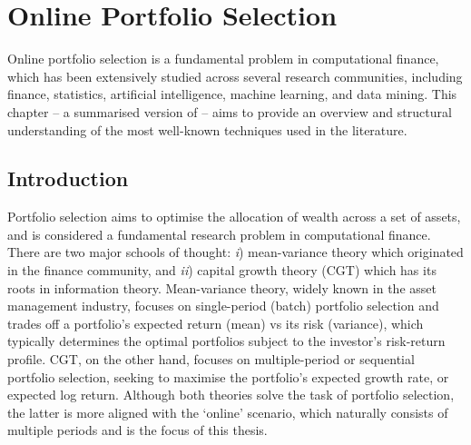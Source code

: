 \chapter{Online Portfolio Selection}
\label{ch:olps}

\minitoc




Online portfolio selection is a fundamental problem in computational finance, which has been extensively studied across several research communities, including finance, statistics, artificial intelligence, machine learning, and data mining. This chapter -- a summarised version of \citep{olps-survey} -- aims to provide an overview and structural understanding of the most well-known techniques used in the literature.




\section{Introduction}

Portfolio selection aims to optimise the allocation of wealth across a set of assets, and is considered a fundamental research problem in computational finance. There are two major schools of thought: \emph{i}) mean-variance theory \citep{markowitz52, markowitz59, markowitz00} which originated in the finance community, and \emph{ii}) capital growth theory (CGT) \citep{kelly, hakansson95} which has its roots in information theory. Mean-variance theory, widely known in the asset management industry, focuses on single-period (batch) portfolio selection and trades off a portfolio's expected return (mean) vs its risk (variance), which typically determines the optimal portfolios subject to the investor's risk-return profile. CGT, on the other hand, focuses on multiple-period or sequential portfolio selection, seeking to maximise the portfolio's expected growth rate, or expected log return. Although both theories solve the task of portfolio selection, the latter is more aligned with the `online' scenario, which naturally consists of multiple periods and is the focus of this thesis.

